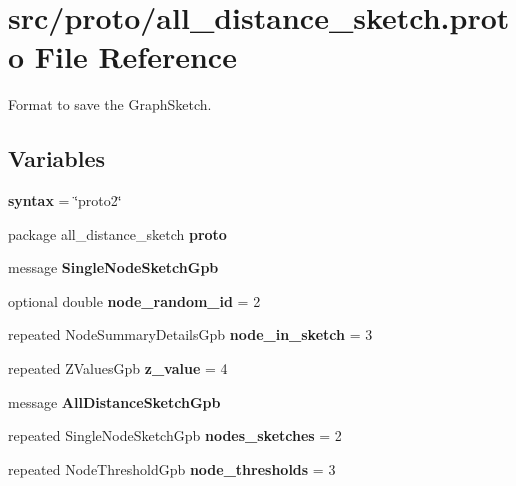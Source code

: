 \hypertarget{all__distance__sketch_8proto}{}\section{src/proto/all\+\_\+distance\+\_\+sketch.proto File Reference}
\label{all__distance__sketch_8proto}


Format to save the Graph\+Sketch.  


\subsection*{Variables}
\begin{DoxyCompactItemize}
\item 
\hypertarget{all__distance__sketch_8proto_adbedb258e13546cc707a6ebb073a3d8a}{}{\bfseries syntax} = \char`\"{}proto2\char`\"{}\label{all__distance__sketch_8proto_adbedb258e13546cc707a6ebb073a3d8a}

\item 
\hypertarget{all__distance__sketch_8proto_a0c41dcc24abdb230ee669507323945ae}{}package all\+\_\+distance\+\_\+sketch {\bfseries proto}\label{all__distance__sketch_8proto_a0c41dcc24abdb230ee669507323945ae}

\item 
message {\bfseries Single\+Node\+Sketch\+Gpb}
\item 
\hypertarget{all__distance__sketch_8proto_a231dd4f63581ac1949ea45cc0b5db5db}{}optional double {\bfseries node\+\_\+random\+\_\+id} = 2\label{all__distance__sketch_8proto_a231dd4f63581ac1949ea45cc0b5db5db}

\item 
\hypertarget{all__distance__sketch_8proto_af8c7e6fa3bca8fe537ed8a6e6e3825fd}{}repeated Node\+Summary\+Details\+Gpb {\bfseries node\+\_\+in\+\_\+sketch} = 3\label{all__distance__sketch_8proto_af8c7e6fa3bca8fe537ed8a6e6e3825fd}

\item 
\hypertarget{all__distance__sketch_8proto_ae5088bdd003d5e97dde2c5fbcddde34e}{}repeated Z\+Values\+Gpb {\bfseries z\+\_\+value} = 4\label{all__distance__sketch_8proto_ae5088bdd003d5e97dde2c5fbcddde34e}

\item 
message {\bfseries All\+Distance\+Sketch\+Gpb}
\item 
\hypertarget{all__distance__sketch_8proto_a765881cd2a0b68feb5c22546efca3c0d}{}repeated Single\+Node\+Sketch\+Gpb {\bfseries nodes\+\_\+sketches} = 2\label{all__distance__sketch_8proto_a765881cd2a0b68feb5c22546efca3c0d}

\item 
\hypertarget{all__distance__sketch_8proto_aed58d88cd21da325983b8812c64a1556}{}repeated Node\+Threshold\+Gpb {\bfseries node\+\_\+thresholds} = 3\label{all__distance__sketch_8proto_aed58d88cd21da325983b8812c64a1556}

\end{DoxyCompactItemize}


